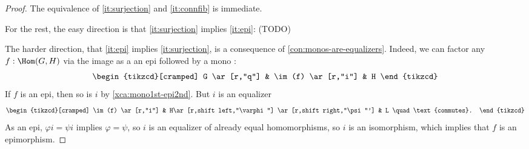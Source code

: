 \begin{proof}
  The equivalence of \ref{it:surjection} and \ref{it:connfib} is immediate.

  For the rest, the easy direction is that \ref{it:surjection} implies \ref{it:epi}:
  (TODO) 

  The harder direction, that \ref{it:epi} implies \ref{it:surjection},
  is a consequence of \cref{con:monos-are-equalizers}.
  Indeed, we can factor any $f : \Hom(G,H)$ via the image as a 
  an epi followed by a mono :
  \[
    \begin{tikzcd}[cramped]
      G \ar[r,"q"] & \im(f) \ar[r,"i"] & H
    \end{tikzcd}
  \]
  If $f$ is an epi, then so is $i$ by \cref{xca:mono1st-epi2nd}. 
  But $i$ is an equalizer 
  \[
    \begin{tikzcd}[cramped]
      \im(f) \ar[r,"i"] & H\ar[r,shift left,"\varphi"]
      \ar[r,shift right,"\psi"'] & L \quad\text{commutes}.
    \end{tikzcd}
  \]
  As an epi, $\varphi i = \psi i$ implies $\varphi = \psi$, so $i$
  is an equalizer of already equal homomorphisms, so $i$ is an isomorphism,
  which implies that $f$ is an epimorphism.
\end{proof}

